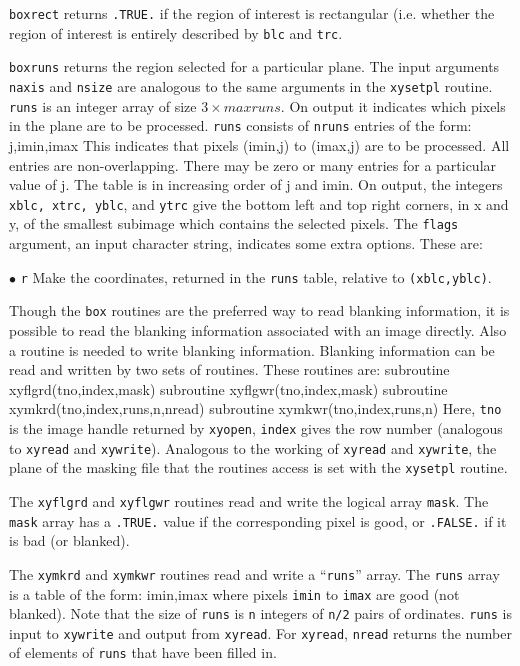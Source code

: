 {\tt boxrect} returns {\tt .TRUE.} if the region
of interest is rectangular (i.e. whether the region of interest is entirely
described by {\tt blc} and {\tt trc}.

{\tt boxruns} returns the region selected for a particular plane.
The input arguments {\tt naxis} and {\tt nsize} are analogous to the same
arguments in the {\tt xysetpl} routine. {\tt runs} is
an integer array of size $3\times maxruns$. On output it indicates which
pixels in the plane are to be processed.  {\tt runs} consists of {\tt nruns}
entries of the form:
{\ninepoint\begintt
     j,imin,imax
\endtt}
This indicates that pixels (imin,j) to (imax,j) are to be processed.
All entries are non-overlapping.
There may be zero or many  entries for a particular value of j. The
table is in increasing order of j and imin. On output, the integers
{\tt xblc, xtrc, yblc}, and {\tt ytrc} give the bottom left and top right
corners, in x and y, of the smallest subimage which contains the selected
pixels.  The {\tt flags} argument, an input character string, indicates
some extra options. These are:
\item{$\bullet$} {\tt r} Make the coordinates, returned in the {\tt runs}
table, relative to {\tt (xblc,yblc)}.


Though the {\tt box} routines are the preferred way to read blanking
information, it is possible to read the blanking information associated with
an image directly. Also a routine is needed to write blanking information.
Blanking information can be read and written by two sets of routines.
These routines are:
{\ninepoint\begintt
      subroutine xyflgrd(tno,index,mask)
      subroutine xyflgwr(tno,index,mask)
      subroutine xymkrd(tno,index,runs,n,nread)
      subroutine xymkwr(tno,index,runs,n)
\endtt}
Here, {\tt tno} is the image handle returned by {\tt xyopen}, {\tt index}
gives the row number (analogous to {\tt xyread} and {\tt xywrite}).
Analogous to the working of {\tt xyread} and {\tt xywrite}, the plane of the
masking file that the routines access is set with the {\tt xysetpl} routine.

The {\tt xyflgrd} and {\tt xyflgwr} routines read and write the logical
array {\tt mask}. The {\tt mask} array has a {\tt .TRUE.} value if the
corresponding pixel is good, or {\tt .FALSE.} if it is bad (or blanked).

The {\tt xymkrd} and {\tt xymkwr} routines read and write a ``{\tt runs}''
array. The {\tt runs} array is a table of the form:
{\ninepoint\begintt
    imin,imax
\endtt}
where pixels {\tt imin} to {\tt imax} are good (not blanked). Note that
the size of {\tt runs} is {\tt n} integers of {\tt n/2} pairs of
ordinates. {\tt runs} is input to {\tt xywrite} and output from
{\tt xyread}. For {\tt xyread}, {\tt nread} returns the number of
elements of {\tt runs} that have been filled in.

